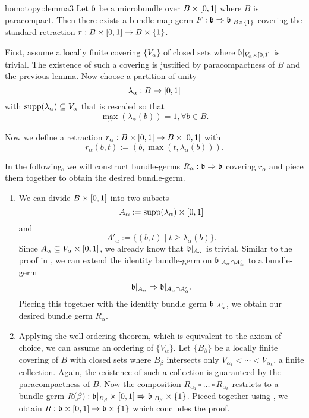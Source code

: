 \begin{scope}
\begin{mylemma}{homotopy::lemma3}
    Let $\bb$ be a microbundle over $B \times \I$ where $B$ is paracompact.
    Then there exists a bundle map-germ $\germdef{F}{\bb}{\bb\restr{B \times \{1\}}}$
    covering the standard retraction $r: B \times \I \to B \times \{1\}$.
\end{mylemma}
\begin{myproof}
    First, assume a locally finite covering $\{V_\alpha\}$ of closed sets where $\bb\restr{V_\alpha \times \I}$ is trivial.
    The existence of such a covering is justified by paracompactness of $B$ and the previous lemma.
    Now choose a partition of unity
    \[ \lambda_\alpha: B \to \I \]
    with $\text{supp}(\lambda_\alpha) \sub V_\alpha$ that is rescaled so that
    \[ \max_{\alpha}(\lambda_\alpha(b)) = 1, \forall b \in B. \]
    
    Now we define a retraction $r_\alpha: B \times \I \to B \times \I$ with
    \[ r_\alpha(b, t) := (b, \max(t, \lambda_\alpha(b))). \]

    In the following, we will construct bundle-germs $R_\alpha: \bb \double \bb$ covering $r_\alpha$
    and piece them together to obtain the desired bundle-germ.
    \begin{enumerate}
        \item 
        We can divide $B \times \I$ into two subsets
        \[ A_\alpha := \text{supp}(\lambda_\alpha) \times \I \]
        and
        \[ A'_\alpha := \{(b, t) \mid t \ge \lambda_\alpha(b)\}. \]
        Since $A_\alpha \sub V_\alpha \times \I$, we already know that $\bb\restr{A_\alpha}$ is trivial.
        Similar to the proof in , we can extend the identity bundle-germ on $\bb\restr{\A \cap \A[']}$ to a bundle-germ
        \[ \bb\restr{\A} \double \bb\restr{\A \cap \A[']}. \]
        Piecing this together with the identity bundle germ $\bb\restr{\A[']}$, we obtain our desired bundle germ $R_\alpha$.
        
        \item
        Applying the well-ordering theorem, which is equivalent to the axiom of choice, we can assume an ordering of $\{ V_\alpha \}$.
        Let $\{B_\beta\}$ be a locally finite covering of $B$ with closed sets where $B_\beta$ intersects only $V_{\alpha_1} < \cdots < V_{\alpha_k}$, a finite collection.
        Again, the existence of such a collection is guaranteed by the paracompactness of $B$. 
        Now the composition $R_{\alpha_1} \circ \ldots \circ R_{\alpha_k}$ restricts to a bundle germ $R(\beta): \bb\restr{B_\beta} \times \I \double \bb\restr{B_\beta} \times \{1\}$.
        Pieced together using , we obtain $R: \bb \times \I\to \bb \times \{1\}$ which concludes the proof.
    \end{enumerate}    
\end{myproof}


\end{scope}
